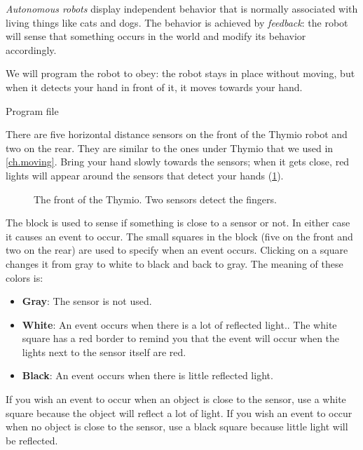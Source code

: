 \label{ch.pet}

\emph{Autonomous robots} display independent behavior that is normally
associated with living things like cats and dogs. The behavior is
achieved by \textit{feedback}: the robot will sense that something
occurs in the world and modify its behavior accordingly.


We will program the robot to obey: the robot stays in place without
moving, but when it detects your hand in front of it, it moves towards
your hand.

{\raggedleft \hfill Program file }

There are five horizontal distance sensors on the front of the Thymio
robot and two on the rear. They are similar to the ones under Thymio
that we used in \cref{ch.moving}. Bring your hand slowly towards the
sensors; when it gets close, red lights will appear around the sensors
that detect your hands (\cref{fig.detect}).

\begin{figure}
\begin{center}
\caption{The front of the Thymio. Two sensors detect the fingers.}\label{fig.detect}
\end{center}
\end{figure}

The block  is used to sense if something is close to a
sensor or not. In either case it causes an event to occur. The small
squares in the block (five on the front and two on the rear) are used to
specify when an event occurs. Clicking on a square changes it from gray
to white to black and back to gray. The meaning of
these colors is:

\begin{itemize}
\item \textbf{Gray}: The sensor is not used.
\item \textbf{White}: An event occurs when there is a lot of reflected
light.\label{p.proximity-colors2}. The white square has a red border
to remind you that the event will occur when the lights next to the sensor 
itself are red.
\item \textbf{Black}: An event occurs when there is little reflected
light.
\end{itemize}

If you wish an event to occur when an object is close to the sensor, use
a white square because the object will reflect a lot of light. If you
wish an event to occur when no object is close to the sensor, use a
black square because little light will be reflected.

